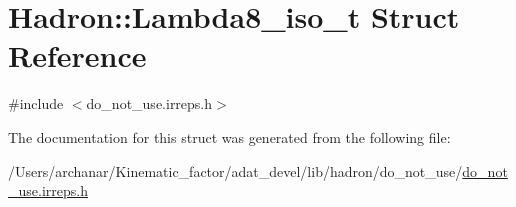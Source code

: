 \hypertarget{structHadron_1_1Lambda8__iso__t}{}\section{Hadron\+:\+:Lambda8\+\_\+iso\+\_\+t Struct Reference}
\label{structHadron_1_1Lambda8__iso__t}


{\ttfamily \#include $<$do\+\_\+not\+\_\+use.\+irreps.\+h$>$}



The documentation for this struct was generated from the following file\+:\begin{DoxyCompactItemize}
\item 
/\+Users/archanar/\+Kinematic\+\_\+factor/adat\+\_\+devel/lib/hadron/do\+\_\+not\+\_\+use/\mbox{\hyperlink{do__not__use_8irreps_8h}{do\+\_\+not\+\_\+use.\+irreps.\+h}}\end{DoxyCompactItemize}
